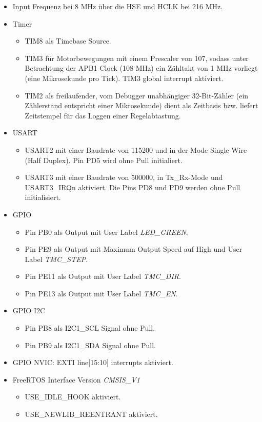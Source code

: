 \begin{itemize}
    \item Input Frequenz bei 8 MHz über die HSE und HCLK bei 216 MHz.
    
    \item Timer
    \begin{itemize}
        \item TIM8 als Timebase Source.
        \item TIM3 für Motorbewegungen mit einem Prescaler von 107, sodass unter Betrachtung der APB1 Clock (108 MHz) ein Zähltakt von 1 MHz vorliegt (eine Mikrosekunde pro Tick). TIM3 global interrupt aktiviert.
        \item TIM2 als freilaufender, vom Debugger unabhängiger 32-Bit-Zähler (ein Zählerstand entspricht einer Mikrosekunde) dient als Zeitbasis bzw. liefert Zeitstempel für das Loggen einer Regelabtastung.
    \end{itemize}
    \item USART
    \begin{itemize}
        \item USART2 mit einer Baudrate von 115200 und in der Mode Single Wire (Half Duplex). Pin PD5 wird ohne Pull initialiert.
        \item USART3 mit einer Baudrate von 500000, in Tx\_Rx-Mode und USART3\_IRQn aktiviert. Die Pins PD8 und PD9 werden ohne Pull initialisiert.
    \end{itemize}
    \item GPIO
    \begin{itemize}
        \item Pin PB0 als Output mit User Label \textit{LED\_GREEN}.
        \item Pin PE9 als Output mit Maximum Output Speed auf High und User Label \textit{TMC\_STEP}.
        \item Pin PE11 als Output mit User Label \textit{TMC\_DIR}.
        \item Pin PE13 als Output mit User Label \textit{TMC\_EN}.
    \end{itemize}
    \item GPIO I2C
    \begin{itemize}
        \item Pin PB8 als I2C1\_SCL Signal ohne Pull.
        \item Pin PB9 als I2C1\_SDA Signal ohne Pull.
    \end{itemize}
    \item GPIO NVIC: EXTI line[15:10] interrupts aktiviert.
    \item FreeRTOS Interface Version \textit{CMSIS\_V1}
    \begin{itemize}
        \item USE\_IDLE\_HOOK aktiviert.
        \item USE\_NEWLIB\_REENTRANT aktiviert.
    \end{itemize}
    
\end{itemize}


